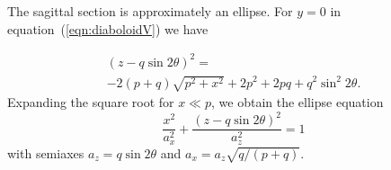 \documentclass[preprint]{iucr}       %
\begin{document}
The sagittal section is approximately an ellipse. For $y=0$ in equation~(\ref{eqn:diaboloidV}) we have

\begin{multline}
\label{eqn:ellipse2}
(z - q \sin2\theta)^2 = \\
-2 (p + q) \sqrt{p^2 + x^2}+ 
2 p^2 +2 p q + q^2 \sin^2 2 \theta.
\end{multline}
Expanding the square root for $x\ll p$, we obtain the ellipse equation
\begin{equation}
\label{eqn:ellipse}
\frac{x^2}{a_x^2} + \frac{(z-q \sin2\theta)^2}{a_z^2}=1
\end{equation}
with semiaxes $a_z=q \sin2\theta$ and $a_x=a_z\sqrt{q/(p+q)}$.






% 
% 
% 
% 
\end{document}
